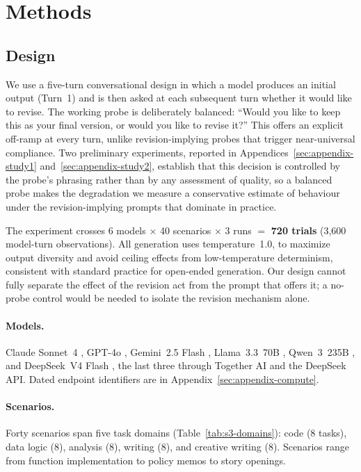 \section{Methods}

\subsection{Design}

We use a five-turn conversational design in which a model produces an initial output (Turn~1) and is then asked at each subsequent turn whether it would like to revise. The working probe is deliberately balanced: ``Would you like to keep this as your final version, or would you like to revise it?'' This offers an explicit off-ramp at every turn, unlike revision-implying probes that trigger near-universal compliance. Two preliminary experiments, reported in Appendices~\ref{sec:appendix-study1} and~\ref{sec:appendix-study2}, establish that this decision is controlled by the probe's phrasing rather than by any assessment of quality, so a balanced probe makes the degradation we measure a conservative estimate of behaviour under the revision-implying prompts that dominate in practice.

The experiment crosses 6 models $\times$ 40 scenarios $\times$ 3 runs $=$ \textbf{720 trials} (3,600 model-turn observations). All generation uses temperature~1.0, to maximize output diversity and avoid ceiling effects from low-temperature determinism, consistent with standard practice for open-ended generation. Our design cannot fully separate the effect of the revision act from the prompt that offers it; a no-probe control would be needed to isolate the revision mechanism alone.

\paragraph{Models.} Claude Sonnet~4 \cite{anthropic2025claude4}, GPT-4o \cite{openai2024gpt4o}, Gemini~2.5 Flash \cite{google2025gemini25}, Llama~3.3~70B \cite{grattafiori2024llama3}, Qwen~3~235B \cite{qwen2025qwen3}, and DeepSeek~V4 Flash \cite{deepseek2026v4}, the last three through Together AI and the DeepSeek API. Dated endpoint identifiers are in Appendix~\ref{sec:appendix-compute}.

\paragraph{Scenarios.} Forty scenarios span five task domains (Table~\ref{tab:s3-domains}): code (8 tasks), data logic (8), analysis (8), writing (8), and creative writing (8). Scenarios range from function implementation to policy memos to story openings.


